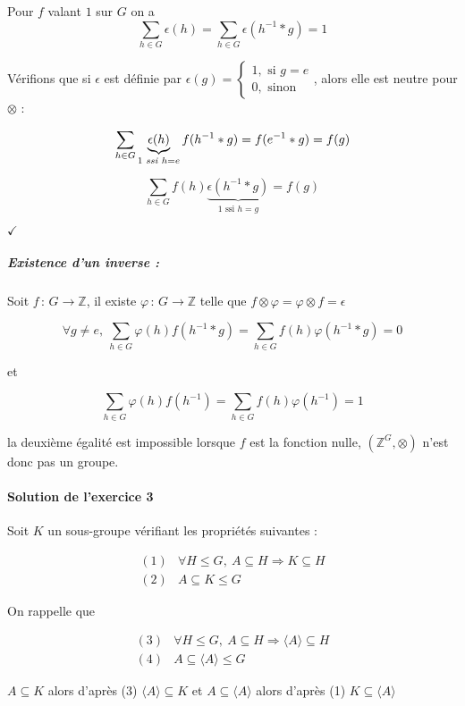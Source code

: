 \documentclass[]{article}
\theoremstyle{remark}
\theoremstyle{definition}
\newcommand{\checked}{
	\hfill$\checkmark$
}
\newcommand{\funcshort}[3]{
#1 \, : \, #2 \longrightarrow #3
}
\begin{document}
Pour $f$ valant $1$ sur $G$ on a
$$\sum_{h \in G}\epsilon(h)=\sum_{h \in G}\epsilon(h^{-1}*g)=1$$

Vérifions que si $\epsilon$ est définie par $\epsilon(g) = \left\{
\begin{array}{l}
	1, \text{ si } g = e \\
	0, \text{ sinon}
\end{array}
\right.$, alors elle est neutre pour $\otimes$ :

$$\sum_{h \in G}\underbrace{\epsilon(h)}_{1 \text{ \textit{ssi} } h = e}f(h^{-1}*g) = f(e^{-1}*g) = f(g)$$

$$\sum_{h \in G}f(h)\underbrace{\epsilon(h^{-1}*g)}_{1 \text{ ssi } h = g}=f(g)$$

\checked

\subparagraph{Existence d'un inverse :}
Soit $\funcshort{f}{G}{\mathbb{Z}}$, il existe $\funcshort{\varphi}{G}{\mathbb{Z}}$ telle que $f \otimes \varphi = \varphi \otimes f = \epsilon$

$$\forall g \neq e, ~ \sum_{h \in G}\varphi(h)f(h^{-1}*g)=\sum_{h \in G}f(h)\varphi(h^{-1}*g)=0$$

et

$$\sum_{h \in G}\varphi(h)f(h^{-1})=\sum_{h \in G}f(h)\varphi(h^{-1})=1$$

la deuxième égalité est impossible lorsque $f$ est la fonction nulle, $\left(\mathbb{Z}^G, \otimes\right)$ n'est donc pas un groupe.

\paragraph{Solution de l'exercice 3}
Soit $K$ un sous-groupe vérifiant les propriétés suivantes :

$$
	\begin{array}{lc}
		(1) & \forall H \leqslant G, ~ A \subseteq H \Longrightarrow K \subseteq H \\
		(2) & A \subseteq K \leqslant G
	\end{array}
$$

On rappelle que 

$$
	\begin{array}{lc}
		(3) & \forall H \leqslant G, ~ A \subseteq H \Longrightarrow \langle A \rangle \subseteq H \\
		(4) & A \subseteq \langle A \rangle \leqslant G
	\end{array}
$$

$A \subseteq K$ alors d'après (3) $\langle A \rangle \subseteq K$ et $A \subseteq \langle A \rangle$ alors d'après (1) $K \subseteq \langle A \rangle$
\end{document}

